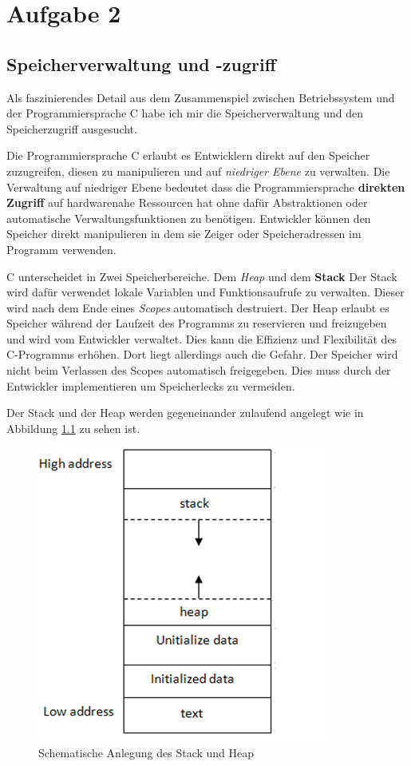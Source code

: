 \chapter{Aufgabe 2}
\section{Speicherverwaltung und -zugriff}
Als faszinierendes Detail aus dem Zusammenspiel zwischen Betriebssystem und der Programmiersprache C habe ich mir die Speicherverwaltung und den Speicherzugriff ausgesucht. \par
Die Programmiersprache C erlaubt es Entwicklern direkt auf den Speicher zuzugreifen, diesen zu manipulieren und auf \textit{niedriger Ebene} zu verwalten.
Die Verwaltung auf niedriger Ebene bedeutet dass die Programmiersprache \textbf{direkten Zugriff} auf hardwarenahe Ressourcen hat ohne dafür Abstraktionen oder automatische Verwaltungsfunktionen zu benötigen.
Entwickler können den Speicher direkt manipulieren in dem sie Zeiger oder Speicheradressen im Programm verwenden. \par
C unterscheidet in Zwei Speicherbereiche.
Dem \textit{Heap} und dem \textbf{Stack}
Der Stack wird dafür verwendet lokale Variablen und Funktionsaufrufe zu verwalten.
Dieser wird nach dem Ende eines \textit{Scopes} automatisch destruiert. 
Der Heap erlaubt es Speicher während der Laufzeit des Programms zu reservieren und freizugeben und wird vom Entwickler verwaltet.
Dies kann die Effizienz und Flexibilität des C-Programms erhöhen.
Dort liegt allerdings auch die Gefahr.
Der Speicher wird nicht beim Verlassen des Scopes automatisch freigegeben\cite{boekelmann:2023}.
Dies muss durch der Entwickler implementieren um Speicherlecks zu vermeiden. \par
Der Stack und der Heap werden gegeneinander zulaufend angelegt wie in Abbildung \ref{stackandheap} zu sehen ist. \par 

\begin{figure}[h]
	\centering
	\includegraphics[scale=0.5]{Images/Speicher_layout.png}
	\caption{Schematische Anlegung des Stack und Heap\cite{stackandheap:2022}}
	\label{stackandheap}
\end{figure}

